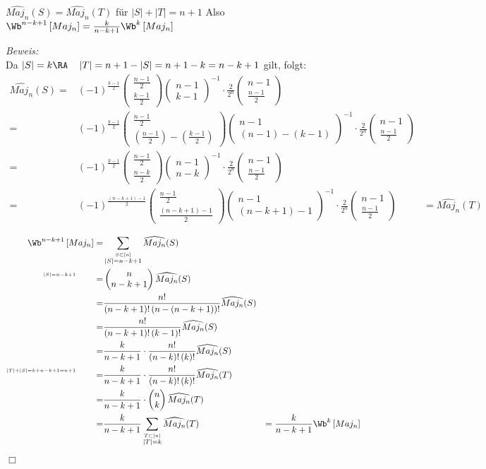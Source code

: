 \documentclass{article}
\newenvironment{proof}{
	\textit{Beweis: \\}
}{
	\begin{flushright}
		$\Box$ 
	\end{flushright}
}
\renewcommand{\binom}[2]{
\begin{pmatrix}
#1 \\
#2
\end{pmatrix}}
\begin{document}
	 \begin{kor}
		 $\widehat{Maj_n}(S)=\widehat{Maj_n}(T)$ f\"ur $\left|S \right| + \left|T \right| = n+1 $ 
		 Also $\Wb^{n-k+1 }\left[ Maj_n \right] = \frac{k}{n-k+1} \Wb^k \left[ Maj_n \right]$ 

	 \begin{proof}	 Da $ \left|S\right|=   k 
			 \RA \quad \left|T \right|=  n+1 - \left|S\right|   = n+1-k  =n-k+1  $ gilt, folgt:
		  \begin{eqnarray*}
			  \widehat{Maj_n} (S) = &(-1)^\frac{k-1}{2} { \binom{\frac{n-1}{2}}{\frac{k-1}{2}}}{\binom{n-1}{k-1}}^{-1} \cdot \frac{2}{2^n}\binom{n-1}{\frac{n-1}{2}} & \\
			  = & (-1)^\frac{k-1}{2} { \binom{\frac{n-1}{2}}{(\frac{n-1}{2})-(\frac{k-1}{2})}}{\binom{n-1}{(n-1)-(k-1)}}^{-1} \cdot \frac{2}{2^n} \binom{n-1}{\frac{n-1}{2}} &\\
			  = & (-1)^\frac{k-1}{2}      { \binom{\frac{n-1}{2}}{\frac{n-k}{2}}      }{\binom{n-1}{n-k}      }^{-1} \cdot \frac{2}{2^n} \binom{n-1}{\frac{n-1}{2}}\\
			  = & (-1)^\frac{(n-k+1)-1}{2} { \binom{\frac{n-1}{2}}{\frac{(n-k+1)-1}{2}}}{\binom{n-1}{(n-k+1)-1}}^{-1} \cdot \frac{2}{2^n} \binom{n-1}{\frac{n-1}{2}} & = \widehat{Maj_n} (T) \\
		  \end{eqnarray*}
		  \begin{eqnarray*}
			  \Wb^{n-k+1 }\left[ Maj_n \right] = & \sum\limits_{\overset{S \subset \left[n\right]}{\left|S\right|=n-k+1}} \widehat{Maj_n} (S)& \\
			^{\overset{\left|S\right|=n-k+1}{}} \qquad = &\binom{n}{n-k+1} \widehat{Maj_n} (S)&\\
			  =& \frac{n!}{\left(n-k+1\right)!\left(n-\left(n-k+1\right)\right)!} \widehat{Maj_n} (S)&\\
  			  =& \frac{n!}{\left(n-k+1\right)!\left(k-1\right)!} \widehat{Maj_n} (S)&\\
			  =& \frac{k}{n-k+1} \cdot  \frac{n!}{\left(n-k\right)!\left(k\right)!} \widehat{Maj_n} (S)&\\ 
  			^{\overset{\left|T\right|+\left|S\right|=k+n-k+1=n+1}{}} \qquad  =& \frac{k}{n-k+1} \cdot  \frac{n!}{\left(n-k\right)!\left(k\right)!} \widehat{Maj_n} (T)&\\ 
			  =& \frac{k}{n-k+1} \cdot  \binom{n}{k} \widehat{Maj_n} (T)&\\ 
			   =& \frac{k}{n-k+1} \sum\limits_{{\overset{T \subset \left[n\right]}{\left|T\right|=k}}} \widehat{Maj_n} (T) & =\frac{k}{n-k+1} \Wb^k \left[ Maj_n \right]
		  \end{eqnarray*}
	 \end{proof}
	 	 \end{kor}
\end{document}
